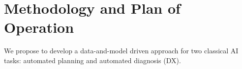 \documentclass[12pt]{article}
\newcommand{\note}[1]{\textbf{\textit{#1}}}
\begin{document}

  







\section{Methodology and Plan of Operation}
\label{sec:methodology}


We propose to develop a data-and-model driven approach for two classical AI tasks: automated planning and automated diagnosis (DX). %

\end{document}
